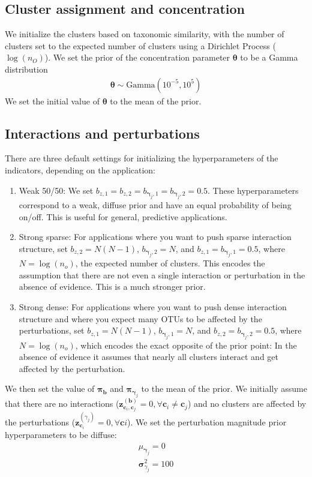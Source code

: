 \documentclass{article}
\newcommand{\Gammadist}{\text{Gamma}}
\renewcommand{\c}{\mathbf{c}}
\newcommand{\concc}{\mathbf{\theta}}
\newcommand{\zbc}[2]{\mathbf{z}^{(\mathbf{b})}_{\c_{#1},\c_{#2}}}
\newcommand{\probb}{\mathbf{\pi}_{\mathbf{b}}}
\newcommand{\pert}{\mathbf{\gamma}_j}
\newcommand{\zpertc}[1]{\mathbf{z}^{(\gamma_j)}_{\c_{#1}}}
\newcommand{\varpert}{\mathbf{\sigma}^2_{\gamma_j}}
\newcommand{\probpert}{\mathbf{\pi}_{\pert}}
\begin{document}
\subsection{Cluster assignment and concentration}
We initialize the clusters based on taxonomic similarity, with the number of clusters set to
the expected number of clusters using a Dirichlet Process ($\log (n_O)$). We set the prior of the concentration parameter $\concc$ to be a Gamma distribution
\begin{align}
  \concc \sim \Gammadist(10^{-5}, 10^5)
\end{align}
We set the initial value of $\concc$ to the mean of the prior.

\subsection{Interactions and perturbations}
There are three default settings for initializing the hyperparameters of the indicators, depending on the application:
\begin{enumerate}
  \item Weak 50/50: We set $b_{z,1} = b_{z,2}= b_{\pert,1} = b_{\pert,2} = 0.5$. These hyperparameters correspond to a weak, diffuse prior and have an equal probability of being on/off. This is useful for general, predictive applications.

  \item Strong sparse: For applications where you want to push sparse interaction structure, set $b_{z,2} = N(N-1)$, $b_{\pert,2} = N$, and $b_{z,1} =b_{\pert,1} = 0.5$, where $N=\log(n_o)$, the expected number of clusters. This encodes the assumption that there are not even a single interaction or perturbation in the absence of evidence. This is a much stronger prior.

  \item Strong dense: For applications where you want to push dense interaction structure and where you expect many OTUs to be affected by the perturbations, set $b_{z,1} = N(N-1)$, $b_{\pert,1} = N$, and $b_{z,2} =b_{\pert,2} = 0.5$, where $N=\log(n_o)$, which encodes the exact opposite of the prior point: In the absence of evidence it assumes that nearly all clusters interact and get affected by the perturbation.

\end{enumerate}
We then set the value of $\probb$ and $\probpert$ to the mean of the prior. We initially assume that there are no interactions ($\zbc{i}{j}=0, \forall \c_i \neq \c_j$) and no clusters are affected by the perturbations ($\zpertc{i} = 0, \forall \c{i}$). We set the perturbation magnitude prior hyperparameters to be diffuse:
\begin{align}
  \mu_{\pert} = 0 \\
  \varpert = 100
\end{align}
\end{document}
